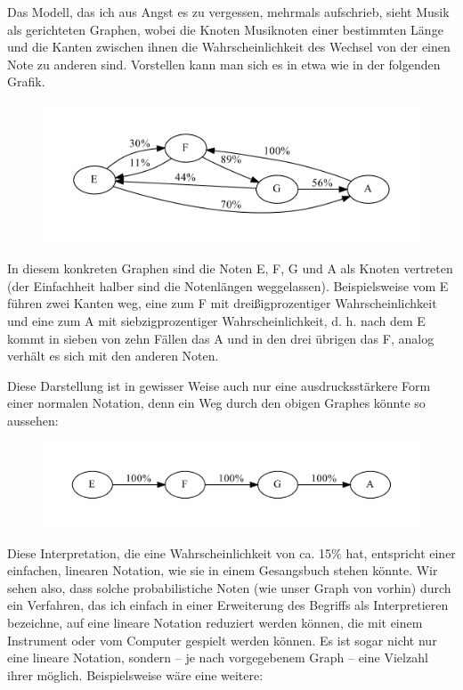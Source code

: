 \documentclass[a4paper,twocolumn]{article}
\begin{document}
Das Modell, das ich aus Angst es zu vergessen, mehrmals aufschrieb,
sieht Musik als gerichteten Graphen, wobei die Knoten Musiknoten einer
bestimmten Länge und die Kanten zwischen ihnen die Wahrscheinlichkeit des
Wechsel von der einen Note zu anderen sind. Vorstellen kann man sich es in etwa wie
in der folgenden Grafik.

\begin{figure}[h]
\includegraphics[width=.5\textwidth]{example-graph}
\end{figure}

In diesem konkreten Graphen sind die Noten E, F, G und A als Knoten vertreten
(der Einfachheit halber sind die Notenlängen weggelassen). Beispielsweise vom E
führen zwei Kanten weg, eine zum F mit dreißigprozentiger Wahrscheinlichkeit und
eine zum A mit siebzigprozentiger Wahrscheinlichkeit, d. h. nach dem E kommt in
sieben von zehn Fällen das A und in den drei übrigen das F, analog verhält
es sich mit den anderen Noten.

Diese Darstellung ist in gewisser Weise auch nur eine ausdrucksstärkere Form
einer normalen Notation, denn ein Weg durch den obigen
Graphes könnte so aussehen:

\begin{figure}[h]
\includegraphics[width=.5\textwidth]{example-graph-interpretation}
\end{figure}

Diese Interpretation, die eine Wahrscheinlichkeit von ca. 15\% hat,
entspricht einer einfachen, linearen Notation, wie sie in einem Gesangsbuch
stehen könnte. Wir sehen also, dass solche probabilistiche Noten (wie unser
Graph von vorhin) durch ein Verfahren, das ich einfach in einer Erweiterung des
Begriffs als Interpretieren bezeichne, auf eine lineare Notation reduziert
werden können, die mit einem Instrument oder vom Computer gespielt werden können. Es
ist sogar nicht nur eine lineare Notation, sondern -- je nach vorgegebenem Graph
-- eine Vielzahl ihrer möglich. Beispielsweise wäre eine weitere:
\end{document}
